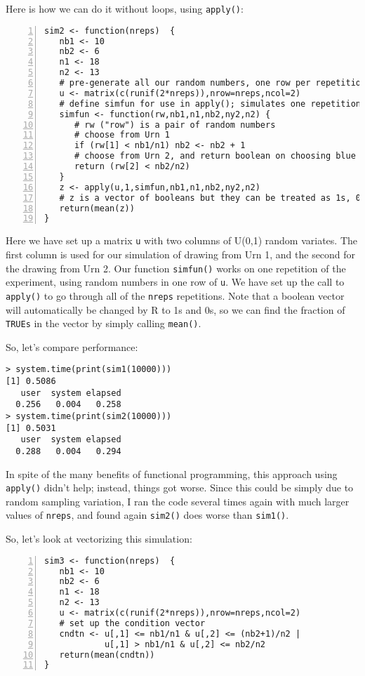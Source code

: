 Here is how we can do it without loops, using {\tt apply()}:
 
\begin{lstlisting}[numbers=left]
sim2 <- function(nreps)  {
   nb1 <- 10  
   nb2 <- 6  
   n1 <- 18 
   n2 <- 13
   # pre-generate all our random numbers, one row per repetition
   u <- matrix(c(runif(2*nreps)),nrow=nreps,ncol=2)
   # define simfun for use in apply(); simulates one repetition
   simfun <- function(rw,nb1,n1,nb2,ny2,n2) {
      # rw ("row") is a pair of random numbers
      # choose from Urn 1
      if (rw[1] < nb1/n1) nb2 <- nb2 + 1
      # choose from Urn 2, and return boolean on choosing blue 
      return (rw[2] < nb2/n2) 
   }
   z <- apply(u,1,simfun,nb1,n1,nb2,ny2,n2)
   # z is a vector of booleans but they can be treated as 1s, 0s
   return(mean(z))  
}
\end{lstlisting}

\noindent Here we have set up a matrix {\tt u} with two columns of
U(0,1) random variates.  The first column is used for our simulation of
drawing from Urn 1, and the second  for the drawing from Urn 2. Our
function {\tt simfun()} works on one repetition of the experiment, using
random numbers in one row of {\tt u}.  We have set up the call to {\tt
apply()} to go through all of the {\tt nreps} repetitions.  Note that a
boolean vector will automatically be changed by R to 1s and 0s, so we
can find the fraction of {\tt TRUEs} in the vector by simply calling
{\tt mean()}.

So, let's compare performance:

\begin{Verbatim}
> system.time(print(sim1(10000)))
[1] 0.5086
   user  system elapsed 
  0.256   0.004   0.258 
> system.time(print(sim2(10000)))
[1] 0.5031
   user  system elapsed 
  0.288   0.004   0.294 
\end{Verbatim}

\noindent
In spite of the many benefits of functional programming, this
approach using {\tt apply()} didn't help; instead, things got worse.
Since this could be simply due to random sampling variation, I ran the
code several times again with much larger values of {\tt nreps}, and
found again {\tt sim2()} does worse than {\tt sim1()}.

So, let's look at vectorizing this simulation:

\begin{lstlisting}[numbers=left]
sim3 <- function(nreps)  {
   nb1 <- 10  
   nb2 <- 6  
   n1 <- 18 
   n2 <- 13
   u <- matrix(c(runif(2*nreps)),nrow=nreps,ncol=2)
   # set up the condition vector 
   cndtn <- u[,1] <= nb1/n1 & u[,2] <= (nb2+1)/n2 |
            u[,1] > nb1/n1 & u[,2] <= nb2/n2 
   return(mean(cndtn))  
}
\end{lstlisting}

